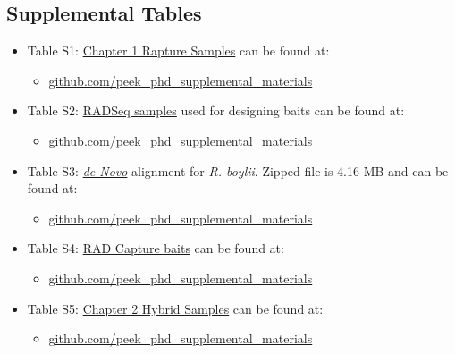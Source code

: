 \documentclass[proquest,12pt,final]{ucthesis-CA2012} %
\providecommand{\tightlist}{%
  \setlength{\itemsep}{0pt}\setlength{\parskip}{0pt}}
\begin{document}
\begin{ucmainmatter}
{\subsection{Supplemental Tables}\label{supptables}}
\begin{itemize}
\tightlist
\item
  Table S1: \protect\hyperlink{ch1samplecollection}{Chapter 1 Rapture
  Samples} can be found at:
  \begin{itemize}
  \tightlist
  \item
    \href{https://raw.githubusercontent.com/ryanpeek/peek_phd_supplemental_materials/master/supplemental_tables/S1_chap1_Rapture_samples.csv}{github.com/peek\_phd\_supplemental\_materials}
  \end{itemize}
\item
  Table S2: \protect\hyperlink{denovo}{RADSeq samples} used for
  designing baits can be found at:
  \begin{itemize}
  \tightlist
  \item
    \href{https://raw.githubusercontent.com/ryanpeek/peek_phd_supplemental_materials/master/supplemental_tables/S2_RADSeq-bait-samples.csv}{github.com/peek\_phd\_supplemental\_materials}
  \end{itemize}
\item
  Table S3: \protect\hyperlink{denovo}{\emph{de Novo}} alignment for
  \emph{R. boylii}. Zipped file is 4.16 MB and can be found at:
  \begin{itemize}
  \tightlist
  \item
    \href{https://github.com/ryanpeek/peek_phd_supplemental_materials/blob/master/supplemental_tables/S3_de_novo_assembly_300.fa.zip?raw=true}{github.com/peek\_phd\_supplemental\_materials}
  \end{itemize}
\item
  Table S4: \protect\hyperlink{rapture}{RAD Capture baits} can be found
  at:
  \begin{itemize}
  \tightlist
  \item
    \href{https://github.com/ryanpeek/peek_phd_supplemental_materials/blob/master/supplemental_tables/S4_capture_baits_120.fa.zip?raw=true}{github.com/peek\_phd\_supplemental\_materials}
  \end{itemize}
\item
  Table S5: \protect\hyperlink{ch2samplecollection}{Chapter 2 Hybrid
  Samples} can be found at:
  \begin{itemize}
  \tightlist
  \item
    \href{https://raw.githubusercontent.com/ryanpeek/peek_phd_supplemental_materials/master/supplemental_tables/S5_chap2_selected_samples_25k.csv}{github.com/peek\_phd\_supplemental\_materials}
  \end{itemize}
\end{itemize}
\hypertarget{code}{%
}
\end{ucmainmatter}
\end{document}
